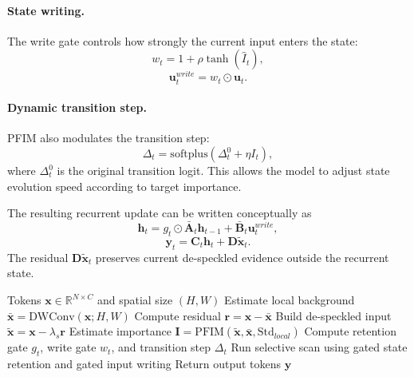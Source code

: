 \documentclass[10pt,twocolumn]{article}
\begin{document}
\paragraph{State writing.}
The write gate controls how strongly the current input enters the state:
\begin{equation}
  w_t = 1 + \rho \tanh(\hat{I}_t),
\end{equation}
\begin{equation}
  \mathbf{u}^{write}_t = w_t \odot \mathbf{u}_t.
\end{equation}

\paragraph{Dynamic transition step.}
PFIM also modulates the transition step:
\begin{equation}
  \Delta_t = \mathrm{softplus}(\Delta^{0}_t + \eta I_t),
\end{equation}
where $\Delta^{0}_t$ is the original transition logit. This allows the model to adjust state evolution speed according to target importance.

The resulting recurrent update can be written conceptually as
\begin{equation}
  \mathbf{h}_t =
  g_t \odot \bar{\mathbf{A}}_t\mathbf{h}_{t-1}
  + \bar{\mathbf{B}}_t\mathbf{u}^{write}_t,
\end{equation}
\begin{equation}
  \mathbf{y}_t = \mathbf{C}_t\mathbf{h}_t + \mathbf{D}\widetilde{\mathbf{x}}_t.
\end{equation}
The residual $\mathbf{D}\widetilde{\mathbf{x}}_t$ preserves current de-speckled evidence outside the recurrent state.

\begin{algorithm}[t]
\caption{IG-DS-SSM Forward Pass}
\begin{algorithmic}[1]
\REQUIRE Tokens $\mathbf{x}\in\mathbb{R}^{N\times C}$ and spatial size $(H,W)$
\STATE Estimate local background $\bar{\mathbf{x}}=\mathrm{DWConv}(\mathbf{x};H,W)$
\STATE Compute residual $\mathbf{r}=\mathbf{x}-\bar{\mathbf{x}}$
\STATE Build de-speckled input $\widetilde{\mathbf{x}}=\mathbf{x}-\lambda_s\mathbf{r}$
\STATE Estimate importance $\mathbf{I}=\mathrm{PFIM}(\widetilde{\mathbf{x}},\bar{\mathbf{x}},\mathrm{Std}_{local})$
\STATE Compute retention gate $g_t$, write gate $w_t$, and transition step $\Delta_t$
\STATE Run selective scan using gated state retention and gated input writing
\STATE Return output tokens $\mathbf{y}$
\end{algorithmic}
\end{algorithm}
\end{document}
